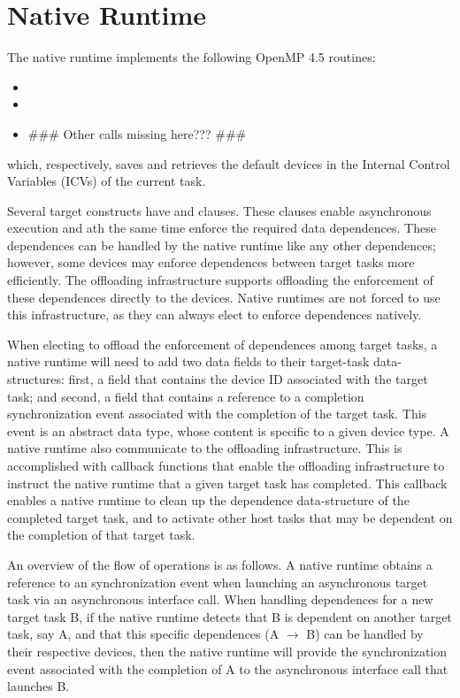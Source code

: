 \section{Native Runtime}

The native runtime implements the following OpenMP 4.5 routines:

\begin{itemize}
  \item {}

  \item {}
  
  \item \#\#\# Other calls missing here??? \#\#\# 
\end{itemize}

which, respectively, saves and retrieves the default devices in the   Internal Control Variables (ICVs) of the current task.

Several target constructs have  and  clauses. These clauses enable asynchronous execution and ath the same time enforce the required data dependences. These dependences can be handled by the native runtime like any other dependences; however, some devices may enforce dependences between target tasks more efficiently. The offloading infrastructure supports offloading the enforcement of these dependences directly to the devices. Native runtimes are not forced to use this infrastructure, as they can always elect to enforce dependences natively.

When electing to offload the enforcement of dependences among target tasks, a native runtime will need to add two data fields to their target-task data-structures: first,  a field that contains the device ID associated with the target task; and second, a field that contains a reference to a completion synchronization event associated with the completion of the target task. This event is an abstract data type, whose content is specific to a given device type. A native runtime also communicate to the offloading infrastructure. This is accomplished with callback functions that enable the offloading infrastructure to instruct the native runtime that a given target task has completed. This callback enables a native runtime to clean up the dependence data-structure of the completed target task, and to activate other host tasks that may be dependent on the completion of that target task.

An overview of the flow of operations is as follows. A native runtime obtains a reference to an synchronization event when launching an asynchronous target task via an asynchronous  interface call. When handling dependences for a new target task B, if the native runtime detects that B is dependent on another target task, say A, and that this specific dependences (A $\rightarrow$ B) can be handled by their respective devices, then the native runtime will provide the synchronization event associated with the completion of A to the asynchronous  interface call that launches B.
